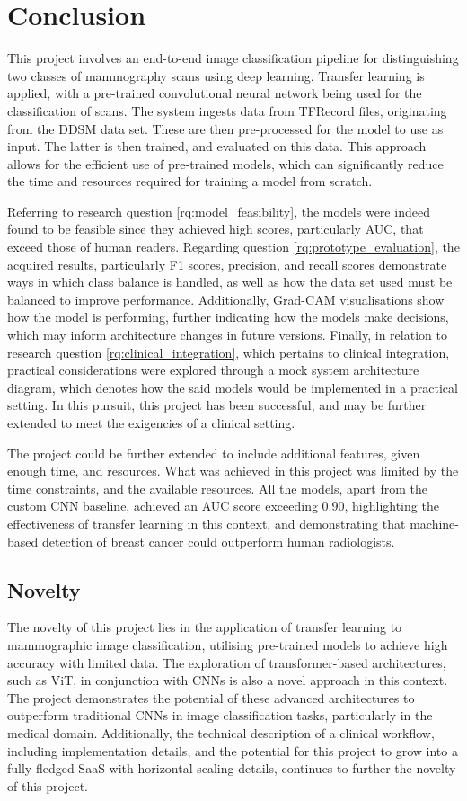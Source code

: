 \documentclass[../main]{subfiles}
\begin{document}
\chapter{Conclusion}
This project involves an end-to-end image classification pipeline for distinguishing two classes of mammography scans using deep learning. Transfer learning is applied, with a pre-trained convolutional neural network being used for the classification of scans. The system ingests data from TFRecord files, originating from the DDSM data set. These are then pre-processed for the model to use as input. The latter is then trained, and evaluated on this data. This approach allows for the efficient use of pre-trained models, which can significantly reduce the time and resources required for training a model from scratch. 

Referring to research question \ref{rq:model_feasibility}, the models were indeed found to be feasible since they achieved high scores, particularly AUC, that exceed those of human readers. Regarding question \ref{rq:prototype_evaluation}, the acquired results, particularly F1 scores, precision, and recall scores demonstrate ways in which class balance is handled, as well as how the data set used must be balanced to improve performance. Additionally, Grad-CAM visualisations show how the model is performing, further indicating how the models make decisions, which may inform architecture changes in future versions. Finally, in relation to research question \ref{rq:clinical_integration}, which pertains to clinical integration, practical considerations were explored through a mock system architecture diagram, which denotes how the said models would be implemented in a practical setting. In this pursuit, this project has been successful, and may be further extended to meet the exigencies of a clinical setting. 

The project could be further extended to include additional features, given enough time, and resources. What was achieved in this project was limited by the time constraints, and the available resources. All the models, apart from the custom CNN baseline, achieved an AUC score exceeding 0.90, highlighting the effectiveness of transfer learning in this context, and demonstrating that machine-based detection of breast cancer could outperform human radiologists.

\section{Novelty}
The novelty of this project lies in the application of transfer learning to mammographic image classification, utilising pre-trained models to achieve high accuracy with limited data. The exploration of transformer-based architectures, such as ViT, in conjunction with CNNs is also a novel approach in this context. The project demonstrates the potential of these advanced architectures to outperform traditional CNNs in image classification tasks, particularly in the medical domain. Additionally, the technical description of a clinical workflow, including implementation details, and the potential for this project to grow into a fully fledged SaaS with horizontal scaling details, continues to further the novelty of this project.
\end{document}
